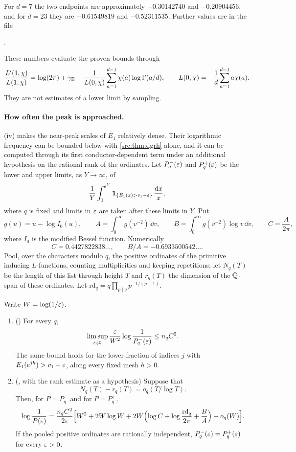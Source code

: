 For $d=7$ the two endpoints are approximately $-0.30142740$ and $-0.20904456$, and for
$d=23$ they are $-0.61549819$ and $-0.52311535$. Further values are in the file
\begin{center}
.
\end{center}
These numbers evaluate the proven bounds through
\[
 \frac{L'(1,\chi)}{L(1,\chi)}=\log(2\pi)+\gamma_{\mathrm{E}}-\frac1{L(0,\chi)}\sum_{a=1}^{d-1}\chi(a)\log\Gamma(a/d),
 \qquad L(0,\chi)=-\frac1d\sum_{a=1}^{d-1}a\chi(a).
\]
They are not estimates of a lower limit by sampling.

\paragraph{How often the peak is approached.}
(iv) makes the near-peak scales of $E_1$ relatively dense. Their logarithmic
frequency can be bounded below with \cref{src:thm:dgrh} alone, and it can be computed through its
first conductor-dependent term under an additional hypothesis on the rational rank of the
ordinates. Let $P_q^-(\varepsilon)$ and $P_q^+(\varepsilon)$ be the lower and upper limits, as $Y\to\infty$, of
\[
 \frac1Y\int_1^{e^Y}\mathbf 1_{\{E_1(x)>v_1-\varepsilon\}}\,\frac{\mathrm{d} x}x ,
\]
where $q$ is fixed and limits in $\varepsilon$ are taken after these limits in $Y$. Put
\[
 g(u)=u-\log I_0(u),\qquad A=\int_0^\infty g(v^{-2})\,\dd v,\qquad
 B=\int_0^\infty g(v^{-2})\log v\,\dd v,\qquad C=\frac A{2\pi},
\]
where $I_0$ is the modified Bessel function. Numerically
\[
 C=0.4427822838\ldots,\qquad B/A=-0.6933500542\ldots .
\]
Pool, over the characters modulo $q$, the positive ordinates of the
primitive inducing $L$-functions, counting multiplicities and keeping repetitions; let $N_q(T)$
be the length of this list through height $T$ and $r_q(T)$ the dimension of the $\mathbb{Q}$-span of these
ordinates. Let $\mathrm{rd}_q=q\prod_{p\mid q}p^{-1/(p-1)}$.

\begin{theorem}\label{zer:thm:visits}
Write $W=\log(1/\varepsilon)$.
\begin{enumerate}[label=\textup{(\roman*)}]
\item \textup{(\stG)} For every $q$,
\[
 \limsup_{\varepsilon\downarrow0}\frac{\varepsilon}{W^2}\log\frac1{P_q^-(\varepsilon)}\le n_qC^2 .
\]
The same bound holds for the lower fraction of indices $j$ with $E_1(e^{jh})>v_1-\varepsilon$, along every
fixed mesh $h>0$.
\item \textup{(\stG, with the rank estimate as a hypothesis)} Suppose that
\begin{equation}\label{zer:eq:rankloss}
 N_q(T)-r_q(T)=o_q(T/\log T).
\end{equation}
Then, for $P=P_q^-$ and for $P=P_q^+$,
\begin{equation}\label{zer:eq:visitlaw}
 \log\frac1{P(\varepsilon)}=\frac{n_qC^2}{2\varepsilon}\Bigl[W^2+2W\log W
 +2W\Bigl(\log C+\log\frac{\mathrm{rd}_q}{2\pi}+\frac BA\Bigr)+o_q(W)\Bigr].
\end{equation}
If the pooled positive ordinates are rationally independent, $P_q^-(\varepsilon)=P_q^+(\varepsilon)$ for every
$\varepsilon>0$.
\end{enumerate}
\end{theorem}

